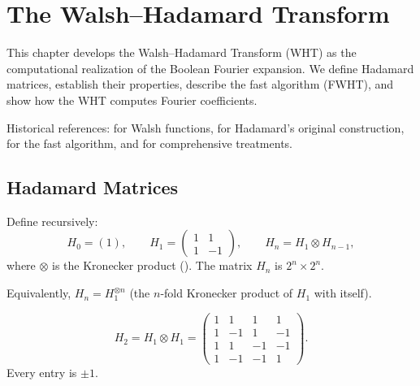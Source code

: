 
\chapter{The Walsh--Hadamard Transform}\label{ch:wht}

This chapter develops the Walsh--Hadamard Transform (WHT) as the
computational realization of the Boolean Fourier expansion. We define
Hadamard matrices, establish their properties, describe the fast
algorithm (FWHT), and show how the WHT computes Fourier coefficients.

Historical references: \citet{walsh1923closed} for Walsh functions,
\citet{hadamard1893resolution} for Hadamard's original construction,
\citet{shanks1969computation} for the fast algorithm,
\citet{beauchamp1984walsh} and \citet{horadam2007hadamard} for
comprehensive treatments.

\section{Hadamard Matrices}\label{sec:hadamard-def}

\begin{definition}\label{def:hadamard}
Define recursively:
\begin{equation}\label{eq:hadamard-recursion}
  H_0 = (1), \qquad
  H_1 = \begin{pmatrix} 1 & 1 \\ 1 & -1 \end{pmatrix}, \qquad
  H_n = H_1 \otimes H_{n-1},
\end{equation}
where $\otimes$ is the Kronecker product ().
The matrix $H_n$ is $2^n \times 2^n$.
\end{definition}

Equivalently, $H_n = H_1^{\otimes n}$ (the $n$-fold Kronecker product of
$H_1$ with itself).

\begin{example}\label{ex:hadamard-small}
\[
H_2 = H_1 \otimes H_1 =
\begin{pmatrix}
  1 &  1 &  1 &  1 \\
  1 & -1 &  1 & -1 \\
  1 &  1 & -1 & -1 \\
  1 & -1 & -1 &  1
\end{pmatrix}.
\]
Every entry is $\pm 1$.
\end{example}


